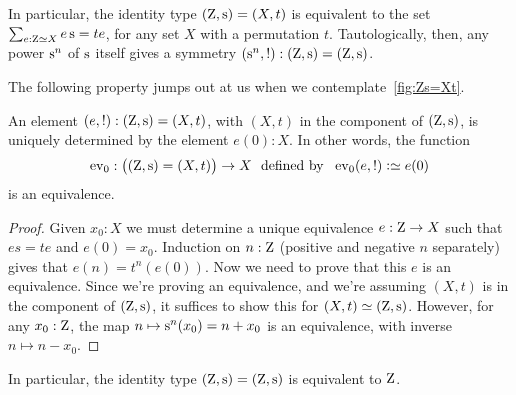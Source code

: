 In particular, the identity type $(\zet,\zs)=(X,t)$
is equivalent to the set $\sum_{e:\zet\equiv X}e\zs=te$, for any set $X$ with a permutation $t$.
Tautologically, then, any power $\zs^n$ of $\zs$ itself gives a symmetry
$(\zs^n,!) : (\zet,\zs)=(\zet,\zs)$.

The following property jumps out at us when we contemplate~\cref{fig:Zs=Xt}.
\begin{lemma}
  \label{lem:IdCisZet}
  An element $(e,!) : (\zet,\zs)=(X,t)$,
  with $(X,t)$ in the component of $(\zet,\zs)$,
  is uniquely determined by the element $e(0):X$.
  In other words, the function
  \[
    \ev_0:\bigl((\zet,\zs)=(X,t)\bigr)\to X
    \text{~~defined by~~} \ev_0(e,!) \defeq e(0)
  \]
  is an equivalence.
\end{lemma}
\begin{proof}
  Given $x_0:X$ we must determine a unique equivalence $e:\mathrm{Z}\to X$
  such that $es=te$ and $e(0)=x_0$.
  Induction on $n:\mathrm{Z}$ (positive and negative $n$ separately)
  gives that $e(n)=t^n(e(0))$.
  Now we need to prove that this $e$ is an equivalence.
  Since we're proving an equivalence, and we're assuming $(X,t)$ is in the component
  of $(\zet,\zs)$, it suffices to show this for $(X,t)\jdeq(\zet,\zs)$.
  However, for any $x_0:\mathrm{Z}$,
  the map $n \mapsto \zs^n(x_0) = n + x_0$ is an equivalence,
  with inverse $n \mapsto n - x_0$.
\end{proof}
In particular, the identity type $(\zet,\zs)=(\zet,\zs)$ is equivalent to $\mathrm{Z}$.

